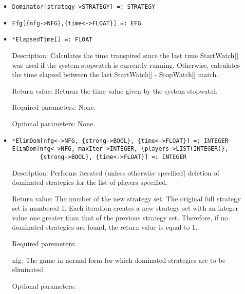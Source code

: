 \begin{itemize}
\item
\protect \large \begin{verbatim}
Dominator[strategy->STRATEGY] =: STRATEGY
\end{verbatim}\normalsize



\item
\protect \large \begin{verbatim}
Efg[{nfg->NFG},{time<->FLOAT}] =: EFG
\end{verbatim}\normalsize

\item

\protect \large \begin{verbatim}
*ElapsedTime[] =: FLOAT
\end{verbatim}\normalsize

\bd
\item
[Description:] Calculates the time transpired since the last time
StartWatch[] was used if the system stopwatch is currently running.
Otherwise, calculates the time elapsed between the last StartWatch[] -
StopWatch[] match.
\item
[Return value:] Returns the time value given by the system stopwatch
\item
[Required parameters:] None.
\item   
[Optional parameters:] None.
\ed

\item
\protect \large \begin{verbatim}
*ElimDom[nfg<->NFG, {strong->BOOL}, {time<->FLOAT}] =: INTEGER
ElimDom[nfg<->NFG, maxIter->INTEGER, {players->LIST(INTEGER)},
        {strong->BOOL}, {time<->FLOAT}] =: INTEGER
\end{verbatim} \normalsize

\bd
\item
[Description:] Performs iterated (unless otherwise specified) deletion
of dominated strategies for the list of players specified.
\item  
[Return value:] The number of the new strategy set.  The original full
strategy set is numbered 1.  Each iteration creates a new strategy set
with an integer value one greater than that of the previous strategy
set.  Therefore, if no dominated strategies are found, the return
value is equal to 1.
\item
[Required paremeters:] 
\bd
\item
[nfg:] The game in normal form for which dominated strategies are to
be eliminated.
\ed	
\item
[Optional parameters:]\hfil\null


\end{itemize}
